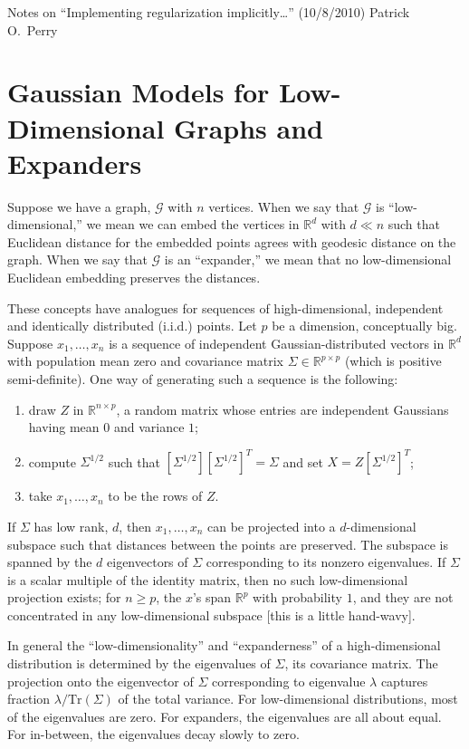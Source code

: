 \documentclass{article}
\begin{document}
\begin{center}
    {\LARGE Notes on ``Implementing regularization implicitly\ldots'' (10/8/2010)}
    {\Large Patrick O.\ Perry}
\end{center}
    
\section{Gaussian Models for Low-Dimensional Graphs and Expanders}

Suppose we have a graph, $\mathcal{G}$ with $n$ vertices.  When we
say that $\mathcal{G}$ is ``low-dimensional,'' we mean we can embed the
vertices in $\mathbb{R}^d$ with $d \ll n$ such that Euclidean distance
for the embedded points agrees with geodesic distance on the graph.  When
we say that $\mathcal{G}$ is an ``expander,'' we mean that no low-dimensional
Euclidean embedding preserves the distances.

These concepts have analogues for sequences of high-dimensional,
independent and identically distributed (i.i.d.) points.  Let $p$ be
a dimension, conceptually big.  Suppose $x_1, \ldots, x_n$ is a sequence
of independent Gaussian-distributed vectors in $\mathbb{R}^d$ with population
mean zero and covariance matrix $\Sigma \in \mathbb{R}^{p \times p}$ 
(which is positive semi-definite).  One way of generating such a sequence
is the following:
\begin{enumerate}
    \item draw $Z$ in $\mathbb{R}^{n \times p}$, a random matrix whose
        entries are independent Gaussians having mean $0$ and variance $1$;
    \item compute $\Sigma^{1/2}$ such that
        $[\Sigma^{1/2}] [\Sigma^{1/2}]^T = \Sigma$ and set
        $X = Z [\Sigma^{1/2}]^{T}$;
    \item take $x_1, \ldots, x_n$ to be the rows of $Z$.
\end{enumerate}
If $\Sigma$ has low rank, $d$, then $x_1, \ldots, x_n$ can be projected
into a $d$-dimensional subspace such that distances between the points
are preserved.  The subspace is spanned by the $d$ eigenvectors of
$\Sigma$ corresponding to its nonzero eigenvalues.  If $\Sigma$ is
a scalar multiple of the identity matrix, then no such low-dimensional
projection exists; for $n \geq p$, the $x$'s span $\mathbb{R}^p$ with
probability $1$, and they are not concentrated in any low-dimensional
subspace [this is a little hand-wavy].

In general the ``low-dimensionality'' and ``expanderness'' of a
high-dimensional distribution is determined by the eigenvalues of $\Sigma$,
its covariance matrix.  The projection onto the eigenvector of $\Sigma$
corresponding to eigenvalue $\lambda$ captures fraction
$\lambda / \mathrm{Tr}(\Sigma)$ of the total variance.  For low-dimensional
distributions, most of the eigenvalues are zero.  For expanders, the
eigenvalues are all about equal.  For in-between, the eigenvalues decay
slowly to zero.
\end{document}
